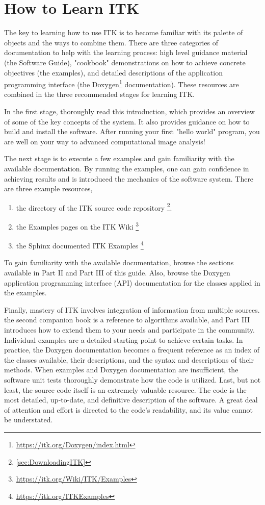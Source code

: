 \section{How to Learn ITK}
\label{sec:HowToLearnITK}

The key to learning how to use ITK is to become familiar with its palette of
objects and the ways to combine them. There are three categories of
documentation to help with the learning process: high level guidance material
(the Software Guide), "cookbook" demonstrations on how to achieve concrete
objectives (the examples), and detailed descriptions of the
application programming interface (the
Doxygen\footnote{\url{https://itk.org/Doxygen/index.html}} documentation). These
resources are combined in the three recommended stages for learning ITK.

In the first stage, thoroughly read this introduction, which provides an
overview of some of the key concepts of the system. It also provides guidance
on how to build and install the software. After running your first "hello
world" program, you are well on your way to advanced computational image
analysis!

The next stage is to execute a few examples and gain familiarity with the
available documentation. By running the examples, one can gain confidence
in achieving results and is introduced the mechanics of the software system.
There are three example resources,
\begin{enumerate}
  \item the  directory of the ITK source code repository \footnote{\ref{sec:DownloadingITK}}.
  \item the Examples pages on the ITK Wiki \footnote{\url{https://itk.org/Wiki/ITK/Examples}}
  \item the Sphinx documented ITK Examples \footnote{\url{https://itk.org/ITKExamples}}
\end{enumerate}
To gain familiarity with the available documentation, browse the sections
available in Part II and Part III of this guide. Also, browse the Doxygen
application programming interface (API) documentation for the classes applied
in the examples.

Finally, mastery of ITK involves integration of information from multiple
sources. the second companion book is a reference to algorithms available, and
Part III introduces how to extend them to your needs and participate in the
community. Individual examples are a detailed starting point to achieve
certain tasks.  In practice, the Doxygen documentation becomes a frequent
reference as an index of the classes available, their descriptions, and the
syntax and descriptions of their methods. When examples and Doxygen
documentation are insufficient, the software unit tests thoroughly demonstrate
how the code is utilized. Last, but not least, the source code itself
is an extremely valuable resource. The code is the most detailed, up-to-date, and
definitive description of the software. A great deal of attention and effort
is directed to the code's readability, and its value cannot be understated.

